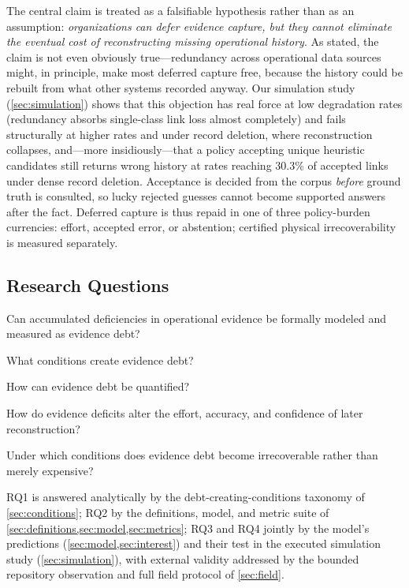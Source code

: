 The central claim is treated as a falsifiable hypothesis rather than as an
assumption: \emph{organizations can defer evidence capture, but
they cannot eliminate the eventual cost of reconstructing missing operational
history}. As stated, the claim is not even obviously true---redundancy across
operational data sources might, in principle, make most deferred capture free,
because the history could be rebuilt from what other systems recorded anyway. Our
simulation study (\cref{sec:simulation}) shows that this objection has real force at
low degradation rates (redundancy absorbs single-class link loss almost completely)
and fails structurally at higher rates and under record deletion, where
reconstruction collapses, and---more insidiously---that a policy accepting unique
heuristic candidates still returns wrong history at rates reaching 30.3\% of
accepted links under dense record deletion. Acceptance is decided from the corpus
\emph{before} ground truth is consulted, so lucky rejected guesses cannot become
supported answers after the fact. Deferred capture is thus repaid in one of three
policy-burden currencies: effort, accepted error, or abstention; certified physical
irrecoverability is measured separately.

\subsection{Research Questions}
\label{sec:rqs}

\begin{description}[leftmargin=3.2em,itemsep=1pt,topsep=2pt]
\item[RQ:] Can accumulated deficiencies in operational evidence be formally modeled
and measured as evidence debt?
\item[RQ1:] What conditions create evidence debt?
\item[RQ2:] How can evidence debt be quantified?
\item[RQ3:] How do evidence deficits alter the effort, accuracy, and confidence of
later reconstruction?
\item[RQ4:] Under which conditions does evidence debt become irrecoverable rather
than merely expensive?
\end{description}

RQ1 is answered analytically by the debt-creating-conditions taxonomy of
\cref{sec:conditions}; RQ2 by the definitions, model, and metric suite of
\cref{sec:definitions,sec:model,sec:metrics}; RQ3 and RQ4 jointly by the model's
predictions (\cref{sec:model,sec:interest}) and their test in the executed
simulation study (\cref{sec:simulation}), with external validity addressed by the
bounded repository observation and full field protocol of \cref{sec:field}.

